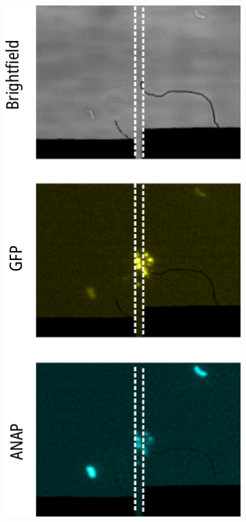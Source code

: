 \begin{figure}[hbtp]
	\centering
	\begin{subfigure}[t]{0.3\textwidth}
		\caption{}\label{ch3fig:unroofed_images}
		\centering
		\includegraphics[width=\textwidth]{unroofed_images.pdf}

\end{subfigure}
\end{figure}
